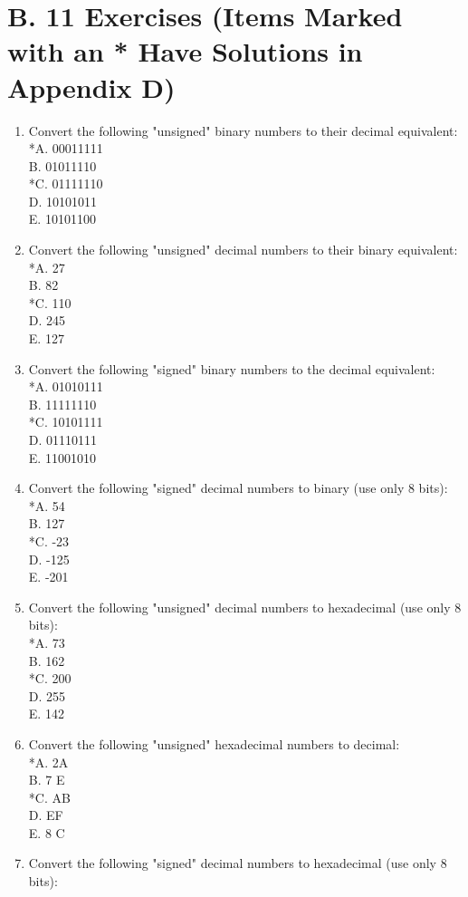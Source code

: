 \documentclass[10pt]{article}
\begin{document}
\section*{B. 11 Exercises (Items Marked with an * Have Solutions in Appendix D)}
\begin{enumerate}
  \item Convert the following "unsigned" binary numbers to their decimal equivalent:\\
*A. 00011111\\
B. 01011110\\
*C. 01111110\\
D. 10101011\\
E. 10101100
  \item Convert the following "unsigned" decimal numbers to their binary equivalent:\\
*A. 27\\
B. 82\\
*C. 110\\
D. 245\\
E. 127
  \item Convert the following "signed" binary numbers to the decimal equivalent:\\
*A. 01010111\\
B. 11111110\\
*C. 10101111\\
D. 01110111\\
E. 11001010
  \item Convert the following "signed" decimal numbers to binary (use only 8 bits):\\
*A. 54\\
B. 127\\
*C. -23\\
D. -125\\
E. -201
  \item Convert the following "unsigned" decimal numbers to hexadecimal (use only 8 bits):\\
*A. 73\\
B. 162\\
*C. 200\\
D. 255\\
E. 142
  \item Convert the following "unsigned" hexadecimal numbers to decimal:\\
*A. 2A\\
B. 7 E\\
*C. AB\\
D. EF\\
E. 8 C
  \item Convert the following "signed" decimal numbers to hexadecimal (use only 8 bits):\\

\end{enumerate}
\end{document}
